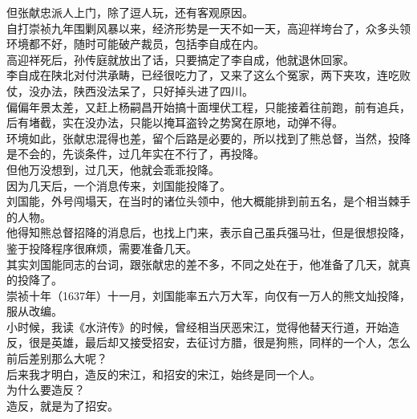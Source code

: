 \begin{multicols}{\theparacolNo}
但张献忠派人上门，除了逗人玩，还有客观原因。\\

自打崇祯九年围剿风暴以来，经济形势是一天不如一天，高迎祥垮台了，众多头领环境都不好，随时可能破产裁员，包括李自成在内。\\

高迎祥死后，孙传庭就放出了话，只要搞定了李自成，他就退休回家。\\

李自成在陕北对付洪承畴，已经很吃力了，又来了这么个冤家，两下夹攻，连吃败仗，没办法，陕西没法呆了，只好掉头进了四川。\\

偏偏年景太差，又赶上杨嗣昌开始搞十面埋伏工程，只能接着往前跑，前有追兵，后有堵截，实在没办法，只能以掩耳盗铃之势窝在原地，动弹不得。\\

环境如此，张献忠混得也差，留个后路是必要的，所以找到了熊总督，当然，投降是不会的，先谈条件，过几年实在不行了，再投降。\\

但他万没想到，过几天，他就会乖乖投降。\\

因为几天后，一个消息传来，刘国能投降了。\\

刘国能，外号闯塌天，在当时的诸位头领中，他大概能排到前五名，是个相当棘手的人物。\\

他得知熊总督招降的消息后，也找上门来，表示自己虽兵强马壮，但是很想投降，鉴于投降程序很麻烦，需要准备几天。\\

其实刘国能同志的台词，跟张献忠的差不多，不同之处在于，他准备了几天，就真的投降了。\\

崇祯十年（1637年）十一月，刘国能率五六万大军，向仅有一万人的熊文灿投降，服从改编。\\

小时候，我读《水浒传》的时候，曾经相当厌恶宋江，觉得他替天行道，开始造反，很是英雄，最后却又接受招安，去征讨方腊，很是狗熊，同样的一个人，怎么前后差别那么大呢？\\

后来我才明白，造反的宋江，和招安的宋江，始终是同一个人。\\

为什么要造反？\\

造反，就是为了招安。\\


\end{multicols}
